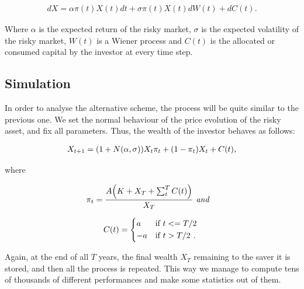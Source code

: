 \begin{align}
    dX = \alpha \pi(t)X(t)dt + \sigma \pi(t)X(t)dW(t) + dC(t)\textit{.}
\end{align}

Where $\alpha$ is the expected return of the risky market, $\sigma$ is the expected volatility of the risky market, $W(t)$ is a Wiener process and $C(t)$ is the allocated or consumed capital by the investor at every time step.

\subsection*{Simulation}

In order to analyse the alternative scheme, the process will be quite similar to the previous one. We set the normal behaviour of the price evolution of the risky asset, and fix all parameters. Thus, the wealth of the investor behaves as follows:

\begin{align}
    X_{t+1} = \qty(1+N(\alpha, \sigma))X_t \pi_t + \qty(1 - \pi_t)X_t + C(t) \textit{,}
\end{align}

where

\begin{align}
    \pi_t = \frac{A\qty(K + X_T + \sum_t^T C(t))}{X_T} & \textit{                           and}
\end{align}

\begin{equation*}
    C(t) =
    \begin{cases*}
      a & if $t <= T/2$ \\
      -a       & if $t > T/2$ \textit{.}
    \end{cases*}
\end{equation*}

Again, at the end of all $T$ years, the final wealth $X_T$ remaining to the saver it is stored, and then all the process is repeated. This way we manage to compute tens of thousands of different performances and make some statistics out of them.

